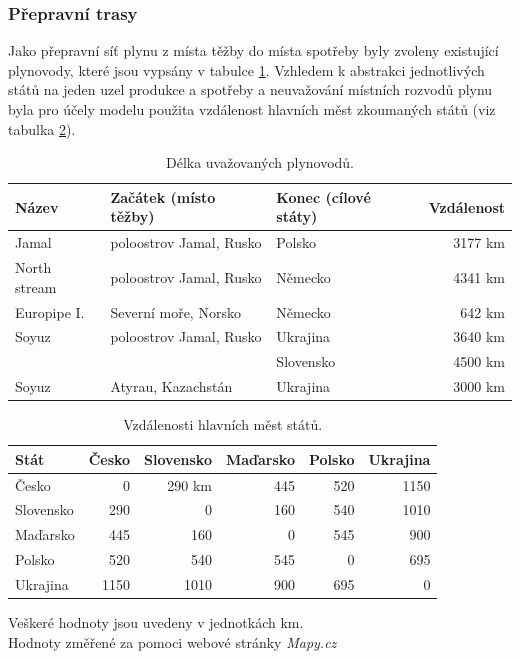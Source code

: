 \documentclass[a4paper,11pt]{article}
\begin{document}
\subsubsection{Přepravní trasy}\label{Preprava}

Jako přepravní síť plynu z místa těžby do místa spotřeby byly zvoleny existující plynovody,
které jsou vypsány v tabulce \ref{plynovody}.
Vzhledem k abstrakci jednotlivých států na jeden uzel produkce a spotřeby
a neuvažování místních rozvodů plynu
byla pro účely modelu použita vzdálenost hlavních měst zkoumaných států
(viz tabulka \ref{staty}).

\begin{table}[h!]
\begin{center}
\begin{tabular}{|l|l|l|r|}
    \hline
    Název 			& Začátek (místo těžby)	& Konec (cílové státy) 		& Vzdálenost\\
    \hline 
    Jamal			& poloostrov Jamal, Rusko	& Polsko				& 3177 km\\ 
    North stream\footnotemark 	& poloostrov Jamal, Rusko & Německo	& 4341 km\\
    Europipe I. 		& Severní moře, Norsko 		& Německo  			& 642 km\\
    Soyuz 			& poloostrov Jamal, Rusko 	& Ukrajina 			& 3640 km\\
					&							& Slovensko			& 4500 km\\
	Soyuz 			& Atyrau, Kazachstán	 		& Ukrajina			& 3000 km\\		 
    \hline
\end{tabular}
\caption{Délka uvažovaných plynovodů.} 
\label{plynovody}
\end{center}
\end{table}


\begin{table}[h!]
\begin{center}
\begin{tabular}{|l|r|r|r|r|r|}
    \hline
    Stát 			& Česko		& Slovensko 		& Maďarsko	& Polsko & Ukrajina\\
    \hline 
    Česko			& 0		& 290 km		& 445	& 520    & 1150\\ 
    Slovensko 		& 290	& 0			& 160	& 540    & 1010\\
    Maďarsko 		& 445	& 160		& 0		& 545 	 & 900\\
    Polsko 			& 520	& 540		& 545 	& 0		 & 695\\
	Ukrajina			& 1150	& 1010		& 900	& 695	 & 0	\\
    \hline
\end{tabular}
\caption{Vzdálenosti hlavních měst států.} 
Veškeré hodnoty jsou uvedeny v jednotkách km.\\
Hodnoty změřené za pomoci webové stránky \textit{Mapy.cz}\footnotemark
\label{staty}
\end{center}
\end{table}
\end{document}
